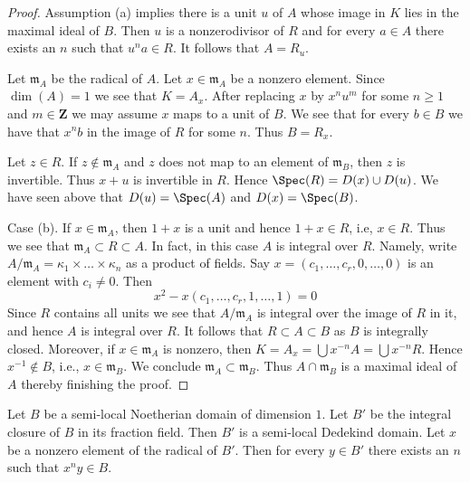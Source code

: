 \begin{proof}
Assumption (a) implies there is a unit $u$ of $A$ whose image in $K$ lies in
the maximal ideal of $B$. Then $u$ is a nonzerodivisor of $R$ and for
every $a \in A$ there exists an $n$ such that $u^n a \in R$. It follows
that $A = R_u$.

\medskip\noindent
Let $\mathfrak m_A$ be the radical of $A$. Let $x \in \mathfrak m_A$
be a nonzero element. Since $\dim(A) = 1$ we see that $K = A_x$.
After replacing $x$ by $x^n u^m$ for some $n \geq 1$ and
$m \in \mathbf{Z}$ we may assume $x$ maps to a unit of $B$.
We see that for every $b \in B$ we have that $x^nb$
in the image of $R$ for some $n$. Thus $B = R_x$.

\medskip\noindent
Let $z \in R$. If $z \not \in \mathfrak m_A$ and $z$ does not map to
an element of $\mathfrak m_B$, then $z$ is invertible.
Thus $x + u$ is invertible in $R$. Hence $\Spec(R) = D(x) \cup D(u)$.
We have seen above that $D(u) = \Spec(A)$ and $D(x) = \Spec(B)$.

\medskip\noindent
Case (b). If $x \in \mathfrak m_A$, then $1 + x$ is a unit and
hence $1 + x \in R$, i.e, $x \in R$. Thus we see that
$\mathfrak m_A \subset R \subset A$. In fact, in this case
$A$ is integral over $R$. Namely, write
$A/\mathfrak m_A = \kappa_1 \times \ldots \times \kappa_n$
as a product of fields. Say $x = (c_1, \ldots, c_r, 0, \ldots, 0)$
is an element with $c_i \not = 0$. Then
$$
x^2 - x(c_1, \ldots, c_r, 1, \ldots, 1)  = 0
$$
Since $R$ contains all units we see that $A/\mathfrak m_A$ is
integral over the image of $R$ in it, and hence $A$ is integral over $R$.
It follows that $R \subset A \subset B$ as $B$ is integrally closed.
Moreover, if $x \in \mathfrak m_A$ is nonzero, then
$K = A_x = \bigcup x^{-n}A = \bigcup x^{-n}R$.
Hence $x^{-1} \not \in B$, i.e., $x \in \mathfrak m_B$.
We conclude $\mathfrak m_A \subset \mathfrak m_B$.
Thus $A \cap \mathfrak m_B$ is a maximal ideal of $A$ thereby
finishing the proof.
\end{proof}

\begin{lemma}
\label{lemma-semi-local-dimension-one-conductor}
Let $B$ be a semi-local Noetherian domain of dimension $1$.
Let $B'$ be the integral closure of $B$ in its fraction field.
Then $B'$ is a semi-local Dedekind domain.
Let $x$ be a nonzero element of the radical of $B'$.
Then for every $y \in B'$ there exists an $n$ such that
$x^n y \in B$.
\end{lemma}

